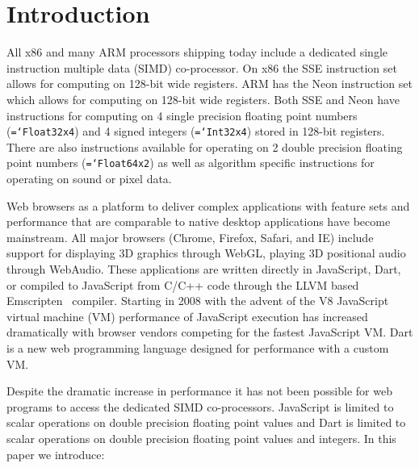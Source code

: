 \documentclass[preprint]{sigplanconf}
\newcommand{\ttt}[1]{{\texttt{\hyphenchar\font=`\-\relax #1}}}%
\begin{document}
\section{Introduction}

All x86 and many ARM processors shipping today include a dedicated single
instruction multiple data (SIMD) co-processor.  On x86 the SSE instruction set
allows for computing on 128-bit wide registers. ARM has the Neon instruction set
which allows for computing on 128-bit wide registers. Both SSE and Neon have
instructions for computing on 4 single precision floating point numbers
(\ttt{Float32x4}) and 4 signed integers (\ttt{Int32x4}) stored in 128-bit
registers. There are also instructions available for operating on 2 double
precision floating point numbers (\ttt{Float64x2}) as well as algorithm specific
instructions for operating on sound or pixel data.

Web browsers as a platform to deliver complex applications with feature sets and
performance that are comparable to native desktop applications have become
mainstream. All major browsers (Chrome, Firefox, Safari, and IE) include support
for displaying 3D graphics through WebGL, playing 3D positional audio through
WebAudio. These applications are written directly in JavaScript, Dart, or
compiled to JavaScript from C/C++ code through the LLVM based
Emscripten~\cite{emscripten} compiler. Starting in 2008 with the advent of the
V8 JavaScript virtual machine (VM) performance of JavaScript execution has
increased dramatically with browser vendors competing for the fastest JavaScript
VM. Dart is a new web programming language designed for performance with a
custom VM.

Despite the dramatic increase in performance it has not been possible for web
programs to access the dedicated SIMD co-processors. JavaScript is limited to
scalar operations on double precision floating point values and Dart is limited
to scalar operations on double precision floating point values and integers. In
this paper we introduce:
\end{document}

